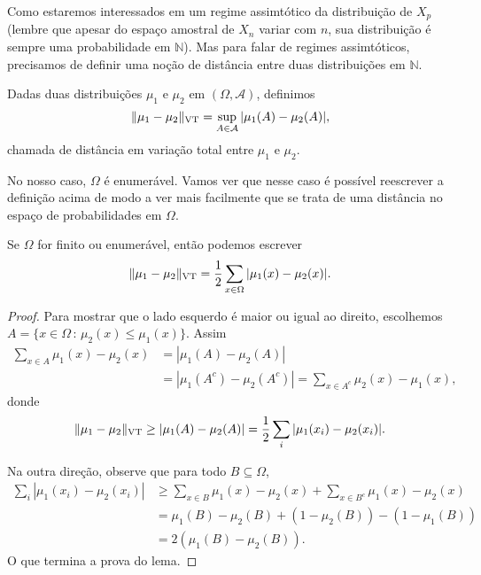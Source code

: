 \begin{topics}
Como estaremos interessados em um regime assimtótico da distribuição de $X_p$ (lembre que apesar do espaço amostral de $X_n$ variar com $n$, sua distribuição é sempre uma probabilidade em $\mathbb{N}$).
Mas para falar de regimes assimtóticos, precisamos de definir uma noção de distância entre duas distribuições em $\mathbb{N}$.

\begin{definition}
Dadas duas distribuições $\mu_1$ e $\mu_2$ em $(\Omega, \mathcal{A})$, definimos
\begin{equation}
  \lVert \mu_1 - \mu_2 \rVert_{\operatorname{VT}} = \sup_{A \in \mathcal{A}} |\mu_1(A) - \mu_2(A)|,
\end{equation}
 chamada de distância em variação total  entre $\mu_1$ e $\mu_2$.
\end{definition}

No nosso caso, $\Omega$ é enumerável.
Vamos ver que nesse caso é possível reescrever a definição acima de modo a ver mais facilmente que se trata de uma distância no espaço de probabilidades em $\Omega$.

\begin{lemma}
  \label{l:vt_l1}
  Se $\Omega$ for finito ou enumerável, então podemos escrever
  \begin{equation}
    \lVert \mu_1 - \mu_2 \rVert_{\operatorname{VT}} = \frac{1}{2} \sum_{x \in \Omega} |\mu_1(x) - \mu_2(x)|.
  \end{equation}
\end{lemma}

\begin{proof}
Para mostrar que o lado esquerdo é maior ou igual ao direito, escolhemos $A = \{ x \in \Omega \, : \, \mu_2(x) \leq \mu_1(x)\}$. Assim
\begin{equation}
  \begin{split}
    \sum_{x \in A} \mu_1(x) - \mu_2(x) & = |\mu_1(A) - \mu_2(A)|\\
    & = |\mu_1(A^c) - \mu_2(A^c)| = \sum_{x \in A^c} \mu_2(x) - \mu_1(x),
  \end{split}
\end{equation}
donde
\begin{equation}
  \lVert \mu_1 - \mu_2 \rVert_{\operatorname{VT}} \geq |\mu_1(A) - \mu_2(A)| = \frac{1}{2} \sum_{i} |\mu_1(x_i) - \mu_2(x_i)|.
\end{equation}

Na outra direção, observe que para todo $B \subseteq \Omega$,
\begin{equation}
  \begin{split}
    \sum_{i} |\mu_1(x_i) - \mu_2(x_i)| & \geq \sum_{x \in B} \mu_1(x) - \mu_2(x) + \sum_{x \in B^c} \mu_1(x) - \mu_2(x)\\
    & = \mu_1(B) - \mu_2(B) + (1 - \mu_2(B)) - (1 - \mu_1(B))\\
    & = 2(\mu_1(B) - \mu_2(B)).
  \end{split}
\end{equation}
O que termina a prova do lema.
\end{proof}


\end{topics}
